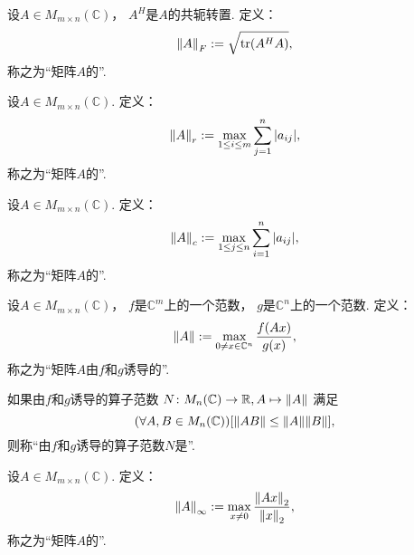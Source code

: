 \begin{definition}
设\(A \in M_{m \times n}(\mathbb{C})\)，
\(A^H\)是\(A\)的共轭转置.
定义：\begin{equation}
	\norm{A}_F
	:=
	\sqrt{
		\tr(A^H A)
	},
\end{equation}
称之为“矩阵\(A\)的”.
\end{definition}

\begin{definition}
设\(A \in M_{m \times n}(\mathbb{C})\).
定义：\begin{equation}
	\norm{A}_r
	:=
	\max_{1 \leq i \leq m} \sum_{j=1}^n \abs{a_{ij}},
\end{equation}
称之为“矩阵\(A\)的”.
\end{definition}

\begin{definition}
设\(A \in M_{m \times n}(\mathbb{C})\).
定义：\begin{equation}
	\norm{A}_c
	:=
	\max_{1 \leq j \leq n} \sum_{i=1}^n \abs{a_{ij}},
\end{equation}
称之为“矩阵\(A\)的”.
\end{definition}

\begin{definition}
设\(A \in M_{m \times n}(\mathbb{C})\)，
\(f\)是\(\mathbb{C}^m\)上的一个范数，
\(g\)是\(\mathbb{C}^n\)上的一个范数.
定义：\begin{equation}
	\norm{A}
	:=
	\max_{0 \neq x \in \mathbb{C}^n} \frac{f(Ax)}{g(x)},
\end{equation}
称之为“矩阵\(A\)由\(f\)和\(g\)诱导的”.
\end{definition}

\begin{definition}
如果由\(f\)和\(g\)诱导的算子范数
\(N\colon M_n(\mathbb{C}) \to \mathbb{R}, A \mapsto \norm{A}\)
满足\begin{equation*}
	(\forall A,B \in M_n(\mathbb{C}))
	[
		\norm{AB}
		\leq \norm{A} \norm{B}
	],
\end{equation*}
则称“由\(f\)和\(g\)诱导的算子范数\(N\)是”.
\end{definition}

\begin{definition}
设\(A \in M_{m \times n}(\mathbb{C})\).
定义：\begin{equation}
	\norm{A}_\infty
	:=
	\max_{x\neq0} \frac{\norm{Ax}_2}{\norm{x}_2},
\end{equation}
称之为“矩阵\(A\)的”.
\end{definition}

